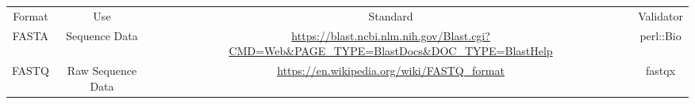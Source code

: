 \begin{tabular}{cccc}
{Format} & {Use} & {Standard} & {Validator} \\
FASTA & Sequence Data & \url{https://blast.ncbi.nlm.nih.gov/Blast.cgi?CMD=Web&PAGE_TYPE=BlastDocs&DOC_TYPE=BlastHelp} & perl::Bio \\
FASTQ & Raw Sequence Data & \url{https://en.wikipedia.org/wiki/FASTQ_format} & fastqx \\

\end{tabular}